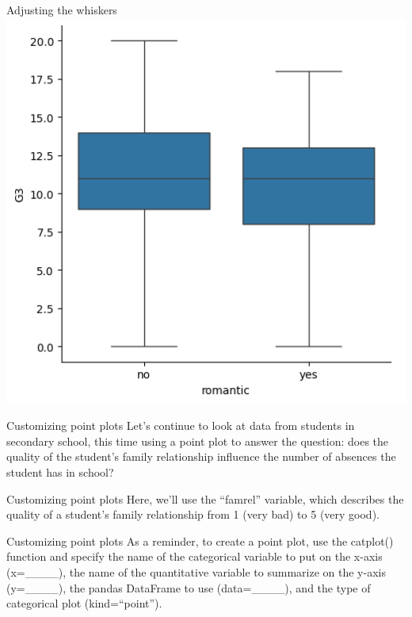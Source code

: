 \documentclass[
  ignorenonframetext,
]{beamer}
\begin{document}
\begin{frame}{Adjusting the whiskers}
\label{adjusting-the-whiskers-8}
\includegraphics{../images/im289.png}
\end{frame}

\begin{frame}{Customizing point plots}
\label{customizing-point-plots}
Let's continue to look at data from students in secondary school, this
time using a point plot to answer the question: does the quality of the
student's family relationship influence the number of absences the
student has in school?
\end{frame}

\begin{frame}{Customizing point plots}
\label{customizing-point-plots-1}
Here, we'll use the ``famrel'' variable, which describes the quality of
a student's family relationship from 1 (very bad) to 5 (very good).
\end{frame}

\begin{frame}{Customizing point plots}
\label{customizing-point-plots-2}
As a reminder, to create a point plot, use the catplot() function and
specify the name of the categorical variable to put on the x-axis
(x=\_\_\_\_), the name of the quantitative variable to summarize on the
y-axis (y=\_\_\_\_), the pandas DataFrame to use (data=\_\_\_\_), and
the type of categorical plot (kind=``point'').
\end{frame}
\end{document}
